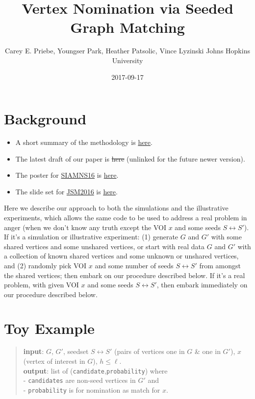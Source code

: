 \documentclass[]{article}
\title{Vertex Nomination via Seeded Graph Matching}
\author{Carey E. Priebe, Youngser Park, Heather Patsolic, Vince Lyzinski Johns
Hopkins University}
\date{2017-09-17}
\providecommand{\tightlist}{%
  \setlength{\itemsep}{0pt}\setlength{\parskip}{0pt}}
\begin{document}
\maketitle

\section{Background}\label{background}

\begin{itemize}
\tightlist
\item
  A short summary of the methodology is
  \href{http://www.cis.jhu.edu/~parky/XDATA/SGM/vnsgm_summary.pdf}{here}.
\item
  The latest draft of our paper is \sout{here} (unlinked for the future
  newer version).
\item
  The poster for \href{http://www.siam.org/meetings/ns16/}{SIAMNS16} is
  \href{http://www.cis.jhu.edu/~parky/XDATA/SGM/SIAM-NS16-VNSGM.pdf}{here}.
\item
  The slide set for
  \href{https://www.amstat.org/meetings/jsm/2016/}{JSM2016} is
  \href{http://www.cis.jhu.edu/~parky/XDATA/SGM/JSM2016-VNLNM.pdf}{here}.
\end{itemize}

Here we describe our approach to both the simulations and the
illustrative experiments, which allows the same code to be used to
address a real problem in anger (when we don't know any truth except the
VOI \(x\) and some seeds \(S \leftrightarrow S'\)).\\
If it's a simulation or illustrative experiment: (1) generate \(G\) and
\(G'\) with some shared vertices and some unshared vertices, or start
with real data \(G\) and \(G'\) with a collection of known shared
vertices and some unknown or unshared vertices, and (2) randomly pick
VOI \(x\) and some number of seeds \(S\leftrightarrow S'\) from amongst
the shared vertices; then embark on our procedure described below. If
it's a real problem, with given VOI \(x\) and some seeds
\(S \leftrightarrow S'\), then embark immediately on our procedure
described below.

\section{Toy Example}\label{toy-example}

\begin{quote}
\textbf{input}: \(G\), \(G'\), seedset \(S\leftrightarrow S'\) (pairs of
vertices one in \(G\) \& one in \(G'\)), \(x\) (vertex of interest in
\(G\)), \(h \leq \ell\).\\
\textbf{output}: list of (\texttt{candidate},\texttt{probability})
where\\
- \texttt{candidates} are non-seed vertices in \(G'\) and\\
- \texttt{probability} is for nomination as match for \(x\).
\end{quote}
\end{document}
